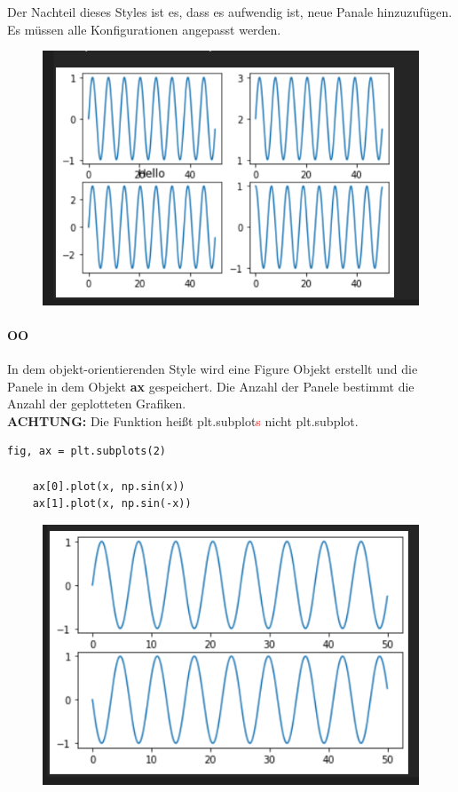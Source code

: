 Der Nachteil dieses Styles ist es, dass es aufwendig ist, neue Panale hinzuzufügen. Es müssen alle Konfigurationen angepasst werden.\\
\begin{figure}[H]
	\centering
	\includegraphics[scale = 0.8]{attachment/chapter_4/Scc019}
\end{figure}
\paragraph{OO}
In dem objekt-orientierenden Style wird eine Figure Objekt erstellt und die Panele in dem Objekt \textbf{ax} gespeichert. Die Anzahl der Panele bestimmt die Anzahl der geplotteten Grafiken. \\

\textbf{ACHTUNG:} Die Funktion heißt plt.subplot\textcolor{red}{s} nicht plt.subplot.

\begin{lstlisting}[style=Python]
	fig, ax = plt.subplots(2)
	
	ax[0].plot(x, np.sin(x))
	ax[1].plot(x, np.sin(-x))
\end{lstlisting}
\begin{figure}[H]
	\centering
	\includegraphics[scale = 0.8]{attachment/chapter_4/Scc020}
\end{figure}

